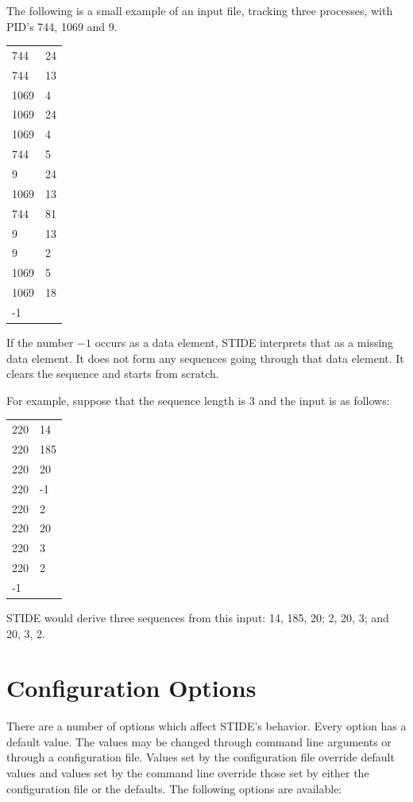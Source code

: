 \documentclass{amsart}
\begin{document}
The following is a small example of an input file, tracking three
processes, with PID's 744, 1069 and 9.

\vspace{.15in}
\begin{tabular}{l l}
744  & 24   \\
744  & 13   \\
1069 & 4    \\
1069 & 24   \\
1069 & 4    \\
744  & 5    \\
9    & 24   \\
1069 & 13   \\
744  & 81   \\
9    & 13   \\
9    & 2    \\
1069 & 5    \\
1069  & 18  \\
-1 
\end{tabular}
\vspace{.15in}

If the number $-1$ occurs as a data element, STIDE interprets that as
a missing data element.  It does not form any sequences going through
that data element.  It clears the sequence and starts from scratch.

For example, suppose that the sequence length is 3 and the input is as
follows:
\nopagebreak
\vspace{5pt}
\begin{tabular}{l l}
220  &  14  \\
220  &  185 \\
220  &  20  \\
220  &  -1  \\
220  &  2   \\
220  &  20  \\
220  &  3   \\
220  &  2  \\
-1 
\end{tabular}
\vspace{.15in}

STIDE would  derive three sequences from this input: 14, 185, 20; 2,
20, 3; and 20, 3, 2.

\section{Configuration Options}
There are a number of options which affect STIDE's behavior.  Every
option has a default value.  The values may be changed through command
line arguments or through a configuration file.  Values set by the
configuration file override default values and values set by the
command line override those set by either the configuration file or
the defaults.  The following options are available:
\end{document}
